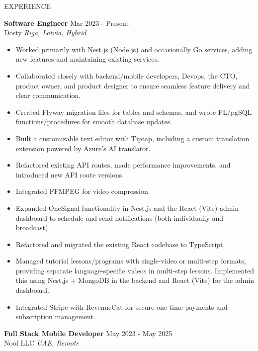 \documentclass{resume} %
\begin{document}

\begin{rSection}{EXPERIENCE}

\textbf{Software Engineer} \hfill Mar 2023 - Present\\
Dosty \hfill \textit{Riga, Latvia, Hybrid}
 \begin{itemize}
    \itemsep -3pt {} 
        \item Worked primarily with Nest.js (Node.js) and occasionally Go services, adding new features and maintaining existing services.
        \item Collaborated closely with backend/mobile developers, Devops, the CTO, product owner, and product designer to ensure seamless feature delivery and clear communication.
        \item Created Flyway migration files for tables and schemas, and wrote PL/pgSQL functions/procedures for smooth database updates.
        \item Built a customizable text editor with Tiptap, including a custom translation extension powered by Azure’s AI translator.
        \item Refactored existing API routes, made performance improvements, and introduced new API route versions.
        \item Integrated FFMPEG for video compression.
        \item Expanded OneSignal functionality in Nest.js and the React (Vite) admin dashboard to schedule and send notifications (both individually and broadcast).
        \item Refactored and migrated the existing React codebase to TypeScript.
        \item Managed tutorial lessons/programs with single-video or multi-step formats, providing separate language-specific videos in multi-step lessons. Implemented this using Nest.js + MongoDB in the backend and React (Vite) for the admin dashboard.
        \item Integrated Stripe with RevenueCat for secure one-time payments and subscription management.
 \end{itemize}

\textbf{Full Stack Mobile Developer} \hfill May 2023 - May 2025\\
Nool LLC \hfill \textit{UAE, Remote}


\end{rSection}
\end{document}
